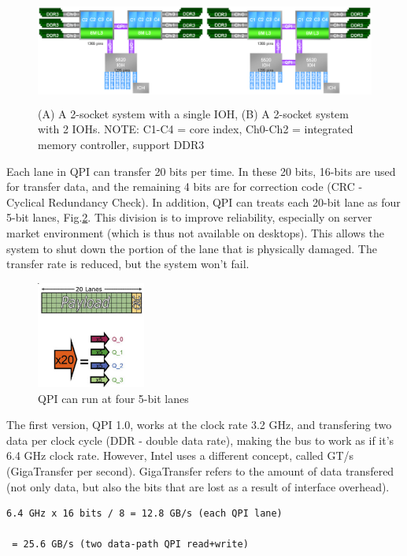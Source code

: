 \begin{figure}[hbt]
  \centerline{\includegraphics[height=3.5cm,
    angle=0]{./images/QPI_connect.eps}}
  \caption{(A) A 2-socket system with a single IOH, (B) A 2-socket system
  with 2 IOHs. NOTE: C1-C4 = core index, Ch0-Ch2 = integrated memory
  controller, support DDR3}
  \label{fig:QPI_connect}
\end{figure}

Each lane in QPI can transfer 20 bits per time. In these 20 bits, 16-bits are
used for transfer data, and the remaining 4 bits are for correction code (CRC -
Cyclical Redundancy Check). In addition, QPI can treats each 20-bit lane as four
5-bit lanes, Fig.\ref{fig:QPI_5bit-lanes}. This division is to improve
reliability, especially on server market environment (which is thus not
available on desktops). This allows the system to shut down the portion of the
lane that is physically damaged. The transfer rate is reduced, but the system
won't fail.

\begin{figure}[hbt]
  \centerline{\includegraphics[height=3.5cm,
    angle=0]{./images/QPI_5bit-lanes.eps}}
  \caption{QPI can run at four 5-bit lanes }
  \label{fig:QPI_5bit-lanes}
\end{figure}

The first version, QPI 1.0, works at the clock rate
3.2 GHz, and transfering two data per clock cycle (DDR - double data rate),
making the bus to work as if it's 6.4 GHz clock rate. However, Intel uses a
different concept, called GT/s (GigaTransfer per second). GigaTransfer refers to
the amount of data transfered (not only data, but also the bits that are lost
as a result of interface overhead). 
\begin{verbatim}
6.4 GHz x 16 bits / 8 = 12.8 GB/s (each QPI lane)

 = 25.6 GB/s (two data-path QPI read+write)
\end{verbatim}

